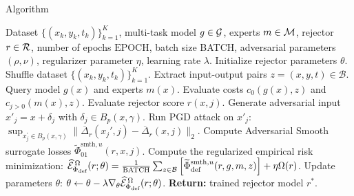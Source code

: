 \begin{appendices}
\begin{algorithm}[H]
   \caption{\name{} Algorithm}
   \label{alg:l2d}
\begin{algorithmic}
    Dataset $\{(x_k, y_k, t_k)\}_{k=1}^K$, multi-task model $g\in\mathcal{G}$, experts $m\in\mathcal{M}$, rejector $r\in\mathcal{R}$, number of epochs $\text{EPOCH}$, batch size BATCH, adversarial parameters $(\rho, \nu)$, regularizer parameter $\eta$, learning rate $\lambda$.
    Initialize rejector parameters $\theta$.
       \STATE Shuffle dataset $\{(x_k, y_k, t_k)\}_{k=1}^K$.
           \STATE Extract input-output pairs $z=(x, y, t) \in \mathcal{B}$.
           \STATE Query model $g(x)$ and experts $m(x)$. \hfill{}
           \STATE Evaluate costs $c_0(g(x),z)$ and $c_{j>0}(m(x),z)$. \hfill{}
                \STATE Evaluate rejector score $r(x,j)$. \hfill{}
                \STATE Generate adversarial input $x'_j = x + \delta_j$ with $\delta_j \in B_p(x, \gamma)$. \hfill{}
                \STATE Run PGD attack on $x'_j$: 
                \STATE \hspace{1em} $\sup_{x_j^\prime \in B_p(x, \gamma)} \| \overline{\Delta}_r(x_j', j) - \overline{\Delta}_r(x, j) \|_2$. \hfill{}
                \STATE Compute Adversarial Smooth surrogate losses $\widetilde{\Phi}_{01}^{\text{smth}, u}(r, x, j)$. 
           \ENDFOR
           \STATE Compute the regularized empirical risk minimization:
           \STATE \hspace{1em} $\widehat{\mathcal{E}}_{\Phi_{\text{def}}}^{\,\Omega}(r;\theta) = \frac{1}{\text{BATCH}} \sum_{z \in \mathcal{B}} \Big[ \widetilde{\Phi}_{\text{def}}^{\text{smth}, u}(r,g,m, z) \Big] + \eta \Omega(r)$.
           \STATE Update parameters $\theta$:
           \STATE \hspace{1em} $\theta \leftarrow \theta - \lambda \nabla_\theta \widehat{\mathcal{E}}_{\Phi_{\text{def}}}^{\,\Omega}(r;\theta)$. \hfill{}
       \ENDFOR
   \ENDFOR
   \STATE \textbf{Return:} trained rejector model $r^\ast$.
\end{algorithmic}
\end{algorithm}




\end{appendices}
